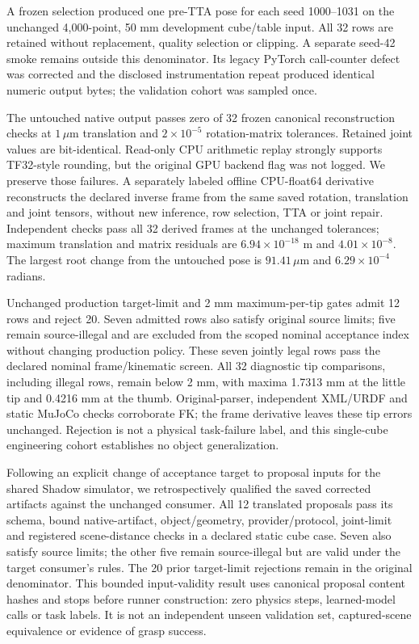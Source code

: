 \documentclass[10pt,letterpaper]{article}
\begin{document}
A frozen selection produced one pre-TTA pose for each seed 1000--1031 on the
unchanged 4,000-point, 50 mm development cube/table input. All 32 rows are
retained without replacement, quality selection or clipping. A separate seed-42
smoke remains outside this denominator. Its legacy PyTorch call-counter defect
was corrected and the disclosed instrumentation repeat produced identical
numeric output bytes; the validation cohort was sampled once.

The untouched native output passes zero of 32 frozen canonical reconstruction
checks at $1\,\mu\mathrm{m}$ translation and $2\times10^{-5}$ rotation-matrix
tolerances. Retained joint values are bit-identical. Read-only CPU arithmetic
replay strongly supports TF32-style rounding, but the original GPU backend flag
was not logged. We preserve those failures. A separately labeled offline
CPU-float64 derivative reconstructs the declared inverse frame from the same
saved rotation, translation and joint tensors, without new inference, row
selection, TTA or joint repair. Independent checks pass all 32 derived frames
at the unchanged tolerances; maximum translation and matrix residuals are
$6.94\times10^{-18}$ m and $4.01\times10^{-8}$. The largest root change from
the untouched pose is $91.41\,\mu\mathrm{m}$ and $6.29\times10^{-4}$ radians.

Unchanged production target-limit and 2 mm maximum-per-tip gates admit 12 rows
and reject 20. Seven admitted rows also satisfy original source limits; five
remain source-illegal and are excluded from the scoped nominal acceptance
index without changing production policy. These seven jointly legal rows pass
the declared nominal frame/kinematic screen. All 32 diagnostic tip comparisons,
including illegal rows, remain below 2 mm, with maxima 1.7313 mm at the little
tip and 0.4216 mm at the thumb. Original-parser, independent XML/URDF and static
MuJoCo checks corroborate FK; the frame derivative leaves these tip errors
unchanged. Rejection is not a physical task-failure label, and this single-cube
engineering cohort establishes no object generalization.

Following an explicit change of acceptance target to proposal inputs for the
shared Shadow simulator, we retrospectively qualified the saved corrected
artifacts against the unchanged consumer. All 12 translated proposals pass its
schema, bound native-artifact, object/geometry, provider/protocol, joint-limit
and registered scene-distance checks in a declared static cube case. Seven
also satisfy source limits; the other five remain source-illegal but are valid
under the target consumer's rules. The 20 prior target-limit rejections remain
in the original denominator. This bounded input-validity result uses canonical
proposal content hashes and stops before runner construction: zero physics
steps, learned-model calls or task labels. It is not an independent unseen
validation set, captured-scene equivalence or evidence of grasp success.
\end{document}
